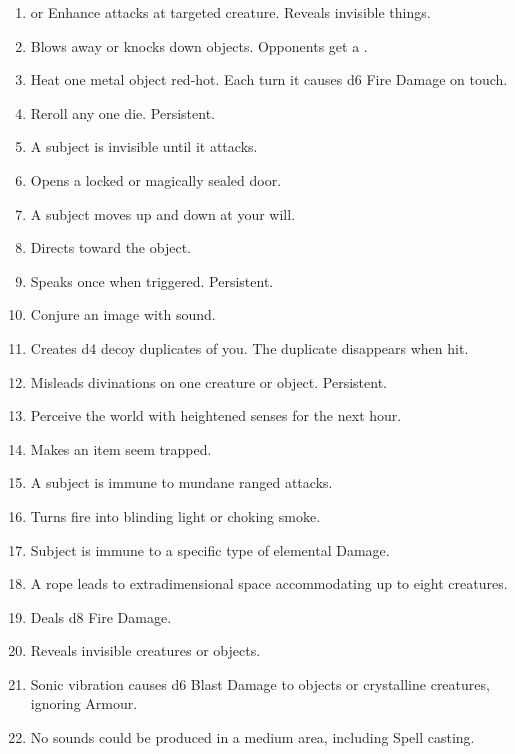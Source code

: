 \documentclass[itdr]{subfiles}
\begin{document}
\begin{enumerate}
	\item {}  or Enhance attacks at targeted creature. Reveals invisible things.
	\item {} Blows away or knocks down objects. Opponents get a .
	\item {} Heat one metal object red-hot. Each turn it causes d6 Fire Damage on touch.
	\item {} Reroll any one die. Persistent.
	\vfill
	\break
	\item {} A subject is invisible until it attacks.
	\item {} Opens a locked or magically sealed door.
	\item {} A subject moves up and down at your will.
	\item {} Directs toward the object.
	\item {} Speaks once when triggered. Persistent.
	\item {} Conjure an image with sound.
	\item {} Creates d4 decoy duplicates of you. The duplicate disappears when hit.
	\item {} Misleads divinations on one creature or object. Persistent.
	\item {} Perceive the world with heightened senses for the next hour.
	\item {} Makes an item seem trapped.
	\item {} A subject is immune to mundane ranged attacks.
	\item {} Turns fire into blinding light or choking smoke.
	\item {} Subject is immune to a specific type of elemental Damage.
	\item {} A rope leads to extradimensional space accommodating up to eight creatures.
	\item {} Deals d8 Fire Damage.
	\item {} Reveals invisible creatures or objects.
	\item {} Sonic vibration causes d6 Blast Damage to objects or crystalline creatures, ignoring Armour.
	\item {} No sounds could be produced in a medium area, including Spell casting.

\end{enumerate}
\end{document}
